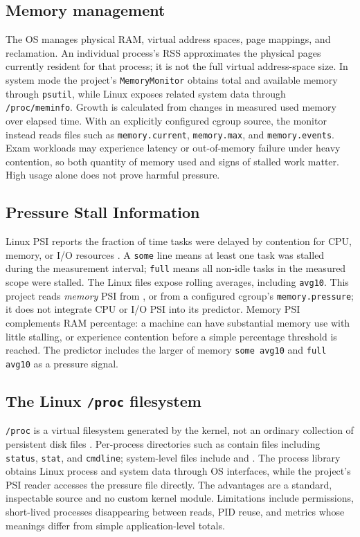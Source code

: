 \documentclass[12pt,a4paper]{article}
\newcommand{\code}[1]{\texttt{#1}}
\begin{document}
\subsection{Memory management}
The OS manages physical RAM, virtual address spaces, page mappings, and reclamation. An individual process's RSS approximates the physical pages currently resident for that process; it is not the full virtual address-space size. In system mode the project's \code{MemoryMonitor} obtains total and available memory through \code{psutil}, while Linux exposes related system data through \code{/proc/meminfo}. Growth is calculated from changes in measured used memory over elapsed time. With an explicitly configured cgroup source, the monitor instead reads files such as \code{memory.current}, \code{memory.max}, and \code{memory.events}. Exam workloads may experience latency or out-of-memory failure under heavy contention, so both quantity of memory used and signs of stalled work matter. High usage alone does not prove harmful pressure.

\subsection{Pressure Stall Information}
Linux PSI reports the fraction of time tasks were delayed by contention for CPU, memory, or I/O resources \cite{psi-doc}. A \code{some} line means at least one task was stalled during the measurement interval; \code{full} means all non-idle tasks in the measured scope were stalled. The Linux files expose rolling averages, including \code{avg10}. This project reads \emph{memory} PSI from , or from a configured cgroup's \code{memory.pressure}; it does not integrate CPU or I/O PSI into its predictor. Memory PSI complements RAM percentage: a machine can have substantial memory use with little stalling, or experience contention before a simple percentage threshold is reached. The predictor includes the larger of memory \code{some avg10} and \code{full avg10} as a pressure signal.

\subsection{The Linux \code{/proc} filesystem}
\code{/proc} is a virtual filesystem generated by the kernel, not an ordinary collection of persistent disk files \cite{proc-man}. Per-process directories such as  contain files including \code{status}, \code{stat}, and \code{cmdline}; system-level files include  and . The process library obtains Linux process and system data through OS interfaces, while the project's PSI reader accesses the pressure file directly. The advantages are a standard, inspectable source and no custom kernel module. Limitations include permissions, short-lived processes disappearing between reads, PID reuse, and metrics whose meanings differ from simple application-level totals.
\end{document}
